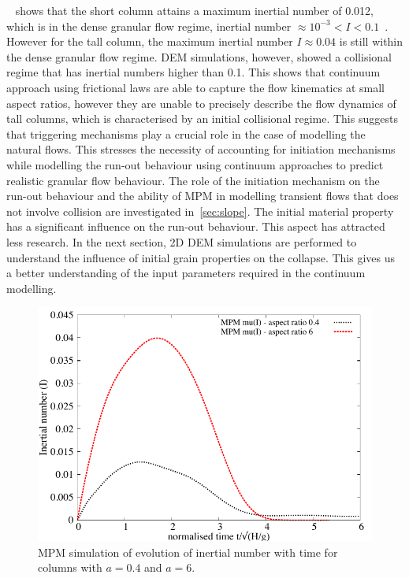 ~ shows that the short column attains a maximum inertial 
number of 0.012, which is in the dense granular flow regime, inertial number 
$\approx10^{-3} < I < 0.1$~\citep{DaCruz2005}. However for the tall 
column, the maximum inertial number $I\approx0.04$ is still within the 
dense granular flow regime. DEM simulations, however, showed a collisional 
regime that has inertial numbers higher than 0.1. This shows that continuum 
approach using frictional laws are able to capture the flow kinematics at small 
aspect ratios, however they are unable to precisely describe the flow dynamics 
of tall columns, which is characterised by an initial collisional regime. This 
suggests that triggering mechanisms play a crucial role in the case of 
modelling the natural flows. This stresses the necessity of accounting for 
initiation mechanisms while modelling the run-out behaviour 
using continuum approaches to predict realistic granular flow behaviour. The 
role of the initiation mechanism on the run-out behaviour and the ability of 
MPM in modelling transient flows that does not involve collision are 
investigated in~\cref{sec:slope}. The initial material property has a 
significant influence on the run-out behaviour. This aspect has attracted less 
research. In the next section, 2D DEM simulations are performed to understand 
the influence of initial grain properties on the collapse. This gives us a 
better understanding of the input parameters required in the continuum 
modelling. 

\begin{figure}[tbhp]
\centering
\includegraphics[width=\textwidth]{muI}
\caption{MPM simulation of evolution of inertial number with time for columns 
with $a=0.4$ and 
$a=6$.}
\label{fig:muI}
\end{figure}


